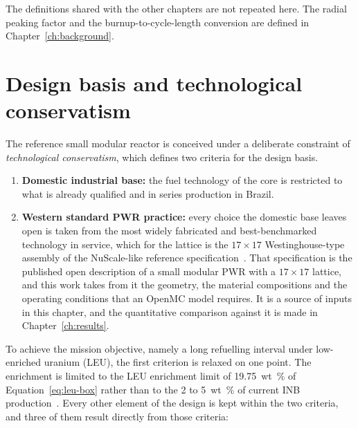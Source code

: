 The definitions shared with the other chapters are not repeated here.
The radial peaking factor and the burnup-to-cycle-length conversion are
defined in Chapter~\ref{ch:background}.

\section{Design basis and technological conservatism}
\label{sec:design-basis}

The reference small modular reactor is conceived under a deliberate
constraint of \emph{technological conservatism}, which defines two criteria for the design basis.

\begin{enumerate}
  \item \textbf{Domestic industrial base:} the fuel technology of the
        core is restricted to what is already qualified and in series
        production in Brazil.

  \item \textbf{Western standard PWR practice:} every choice the
        domestic base leaves open is taken from the most widely
        fabricated and best-benchmarked technology in service, which
        for the lattice is the $17\times17$ Westinghouse-type assembly
        of the NuScale-like reference
        specification~\cite{nuscale_htp2_2017,nuscale_like_core_2024}.
        That specification is the published open description of a small
        modular PWR with a $17\times17$ lattice,
        and this work takes from it the geometry, the material
        compositions and the operating conditions that an OpenMC model
        requires. It is a source of inputs in this chapter, and the
        quantitative comparison against it is made in
        Chapter~\ref{ch:results}.
\end{enumerate}

To achieve the mission objective, namely a long refuelling interval under
low-enriched uranium (LEU), the first criterion is relaxed on one
point. The enrichment is limited to the LEU enrichment limit of \SI{19.75}{wt\%} of Equation~\eqref{eq:leu-box} rather than to the 2 to \SI{5}{wt\%} of
current INB production~\cite{inb_resende}. Every other element of the
design is kept within the two criteria, and three of them result
directly from those criteria:

